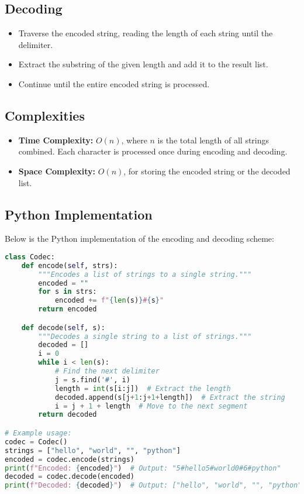 \subsection*{Decoding}
\begin{itemize}
    \item Traverse the encoded string, reading the length of each string until the delimiter.
    \item Extract the substring of the given length and add it to the result list.
    \item Continue until the entire encoded string is processed.
\end{itemize}

\subsection*{Complexities}
\begin{itemize}
    \item \textbf{Time Complexity:} \(O(n)\), where \(n\) is the total length of all strings combined. Each character is processed once during encoding and decoding.
    \item \textbf{Space Complexity:} \(O(n)\), for storing the encoded string or the decoded list.
\end{itemize}

\subsection*{Python Implementation}
Below is the Python implementation of the encoding and decoding scheme:

\begin{fullwidth}
\begin{lstlisting}[language=Python]
class Codec:
    def encode(self, strs):
        """Encodes a list of strings to a single string."""
        encoded = ""
        for s in strs:
            encoded += f"{len(s)}#{s}"
        return encoded

    def decode(self, s):
        """Decodes a single string to a list of strings."""
        decoded = []
        i = 0
        while i < len(s):
            # Find the next delimiter
            j = s.find('#', i)
            length = int(s[i:j])  # Extract the length
            decoded.append(s[j+1:j+1+length])  # Extract the string
            i = j + 1 + length  # Move to the next segment
        return decoded

# Example usage:
codec = Codec()
strings = ["hello", "world", "", "python"]
encoded = codec.encode(strings)
print(f"Encoded: {encoded}")  # Output: "5#hello5#world0#6#python"
decoded = codec.decode(encoded)
print(f"Decoded: {decoded}")  # Output: ["hello", "world", "", "python"]
\end{lstlisting}
\end{fullwidth}

